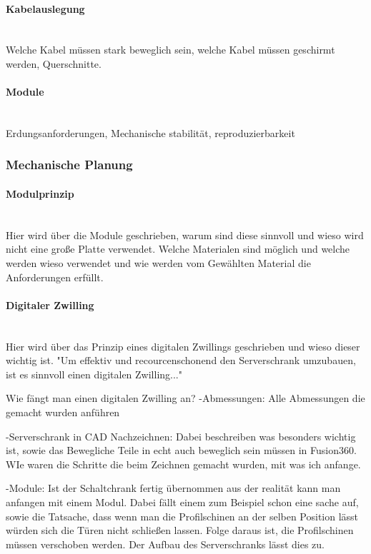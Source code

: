     \paragraph{Kabelauslegung}\mbox{}\\
    Welche Kabel müssen stark beweglich sein, welche Kabel müssen geschirmt werden, Querschnitte.

    \paragraph{Module}\mbox{}\\
    Erdungsanforderungen, Mechanische stabilität, reproduzierbarkeit

\subsubsection{Mechanische Planung}

    \paragraph{Modulprinzip}\mbox{}\\
    Hier wird über die Module geschrieben, warum sind diese sinnvoll und wieso wird nicht eine große Platte verwendet. Welche Materialen sind möglich und welche werden wieso verwendet und wie werden vom Gewählten Material die Anforderungen erfüllt.
    
    \paragraph{Digitaler Zwilling}\mbox{}\\
    Hier wird über das Prinzip eines digitalen Zwillings geschrieben und wieso dieser wichtig ist. "Um effektiv und recourcenschonend den Serverschrank umzubauen, ist es sinnvoll einen digitalen Zwilling..." 
    
    Wie fängt man einen digitalen Zwilling an?
    -Abmessungen: Alle Abmessungen die gemacht wurden anführen

    -Serverschrank in CAD Nachzeichnen: Dabei beschreiben was besonders wichtig ist, sowie das Bewegliche Teile in echt auch beweglich sein müssen in Fusion360. WIe waren die Schritte die beim Zeichnen gemacht wurden, mit was ich anfange.

    -Module: Ist der Schaltchrank fertig übernommen aus der realität kann man anfangen mit einem Modul. Dabei fällt einem zum Beispiel schon eine sache auf, sowie die Tatsache, dass wenn man die Profilschinen an der selben Position lässt würden sich die Türen nicht schließen lassen. Folge daraus ist, die Profilschinen müssen verschoben werden. Der Aufbau des Serverschranks lässt dies zu.

